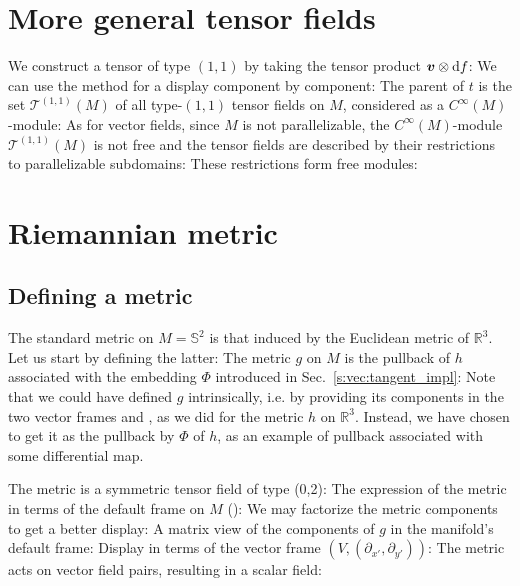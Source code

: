 \section{More general tensor fields}

We construct a tensor of type $(1,1)$ by taking the tensor product
$\bm{v}\otimes \mathrm{d}f$:
We can use the method  for a display component by
component:
The parent of $t$ is the set $\mathcal{T}^{(1,1)}(M)$ of all type-$(1,1)$
tensor fields on $M$,
considered as a $C^\infty(M)$-module:
As for vector fields, since $M$ is not parallelizable, the $C^\infty(M)$-module
$\mathcal{T}^{(1,1)}(M)$ is not free and the tensor fields are described by
their restrictions to parallelizable subdomains:
These restrictions form free modules:

\section{Riemannian metric}

\subsection{Defining a metric}

The standard metric on $M=\mathbb{S}^2$ is that induced by the Euclidean metric of $\mathbb{R}^3$. Let us start by defining the latter:
The metric $g$ on $M$ is the pullback of $h$ associated with the embedding $\Phi$
introduced in Sec.~\ref{s:vec:tangent_impl}:
Note that we could have defined $g$ intrinsically, i.e. by providing its components in the two vector frames  and , as we did for the metric $h$ on $\mathbb{R}^3$. Instead, we have chosen to get it as the pullback by $\Phi$ of $h$, as an example of pullback associated with some differential map.

The metric is a symmetric tensor field of type (0,2):
The expression of the metric in terms of the default frame on $M$ ():
We may factorize the metric components to get a better display:
A matrix view of the components of $g$ in the manifold's default frame:
Display in terms of the vector frame $(V, (\partial_{x'}, \partial_{y'}))$:
The metric acts on vector field pairs, resulting in a scalar field:

